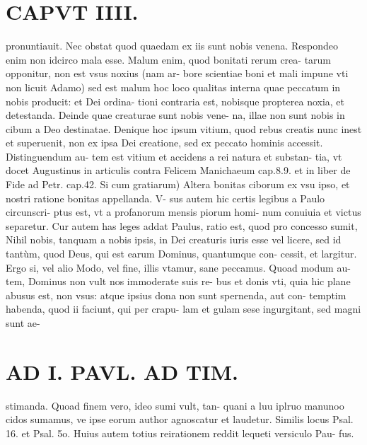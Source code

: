 \documentclass{article}
\begin{document}
\begin{pages}
\section*{CAPVT  IIII. }
\marginpar{[ p.1 ]}\pstart pronuntiauit. Nec obstat quod quaedam ex iis sunt nobis venena. Respondeo enim non idcirco mala esse. Malum enim, quod bonitati rerum crea- tarum opponitur, non est vsus noxius (nam ar- bore scientiae boni et mali impune vti non licuit Adamo) sed est malum hoc loco qualitas interna quae peccatum in nobis producit: et Dei ordina- tioni contraria est, nobisque propterea noxia, et detestanda. Deinde quae creaturae sunt nobis vene- na, illae non sunt nobis in cibum a Deo destinatae. Denique hoc ipsum vitium, quod rebus creatis nunc inest et superuenit, non ex ipsa Dei creatione, sed ex peccato hominis accessit. Distinguendum au- tem est vitium et accidens a rei natura et substan- tia, vt docet Augustinus in articulis contra Felicem Manichaeum cap.8.9. et in liber  de Fide ad Petr. cap.42.  \pend\pstart Si cum gratiarum) Altera bonitas ciborum ex vsu ipso, et nostri ratione bonitas appellanda. V- sus autem hic certis legibus a Paulo circunscri- ptus est, vt a profanorum mensis piorum homi- num conuiuia et victus separetur. Cur autem has leges addat Paulus, ratio est, quod pro concesso sumit, Nihil nobis, tanquam a nobis ipsis, in Dei creaturis iuris esse vel licere, sed id tantùm, quod Deus, qui est earum Dominus, quantumque con- cessit, et largitur. Ergo si, vel alio Modo, vel fine, illis vtamur, sane peccamus. Quoad modum au- tem, Dominus non vult nos immoderate suis re- bus et donis vti, quia hic plane abusus est, non vsus: atque  ipsius dona non sunt spernenda, aut con- temptim habenda, quod ii faciunt, qui per crapu- lam et gulam sese ingurgitant, sed magni sunt ae-  \pend
\section*{AD I. PAVL. AD TIM. }
\marginpar{[ p.Io ]}\pstart stimanda. Quoad finem vero, ideo sumi vult, tan- quani a luu iplruo manunoo cidos sumamus, ve ipse eorum author agnoscatur et laudetur.  \pend\pstart Similis locus Psal. 16. et Psal. 5o. Huius autem totius reirationem reddit lequeti versiculo Pau- fus.  \pend
{}
{}

\end{pages}
\end{document}
